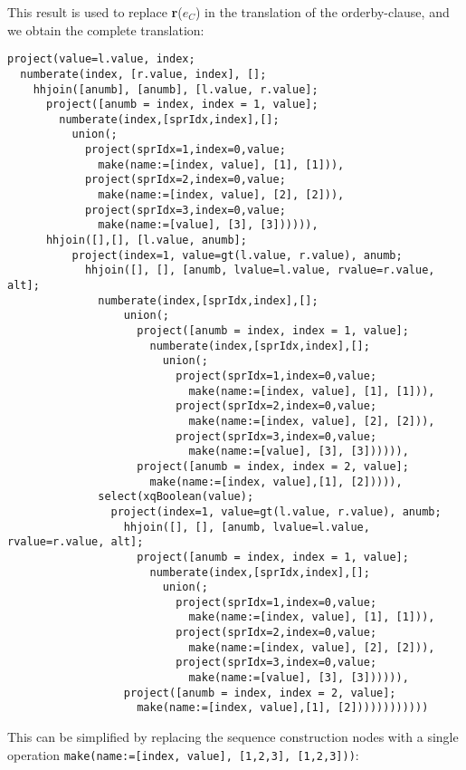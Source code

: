 This result is used to replace \textbf{r}($e_C$) in the translation of the
orderby-clause, and we obtain the complete translation:

\begin{Verbatim}
project(value=l.value, index;
  numberate(index, [r.value, index], [];
    hhjoin([anumb], [anumb], [l.value, r.value];
      project([anumb = index, index = 1, value];
        numberate(index,[sprIdx,index],[];
          union(;
            project(sprIdx=1,index=0,value;
              make(name:=[index, value], [1], [1])),
            project(sprIdx=2,index=0,value;
              make(name:=[index, value], [2], [2])),
            project(sprIdx=3,index=0,value;
              make(name:=[value], [3], [3]))))),
      hhjoin([],[], [l.value, anumb];
          project(index=1, value=gt(l.value, r.value), anumb;
            hhjoin([], [], [anumb, lvalue=l.value, rvalue=r.value, alt];
              numberate(index,[sprIdx,index],[];
                  union(;
                    project([anumb = index, index = 1, value];
                      numberate(index,[sprIdx,index],[];
                        union(;
                          project(sprIdx=1,index=0,value;
                            make(name:=[index, value], [1], [1])),
                          project(sprIdx=2,index=0,value;
                            make(name:=[index, value], [2], [2])),
                          project(sprIdx=3,index=0,value;
                            make(name:=[value], [3], [3]))))),
                    project([anumb = index, index = 2, value];
                      make(name:=[index, value],[1], [2])))),
              select(xqBoolean(value);
                project(index=1, value=gt(l.value, r.value), anumb;
                  hhjoin([], [], [anumb, lvalue=l.value, rvalue=r.value, alt];
                    project([anumb = index, index = 1, value];
                      numberate(index,[sprIdx,index],[];
                        union(;
                          project(sprIdx=1,index=0,value;
                            make(name:=[index, value], [1], [1])),
                          project(sprIdx=2,index=0,value;
                            make(name:=[index, value], [2], [2])),
                          project(sprIdx=3,index=0,value;
                            make(name:=[value], [3], [3]))))),
                  project([anumb = index, index = 2, value];
                    make(name:=[index, value],[1], [2])))))))))))
\end{Verbatim}
 
This can be simplified by replacing the sequence construction nodes with a
single operation \texttt{make(name:=[index, value], [1,2,3], [1,2,3]))}:

